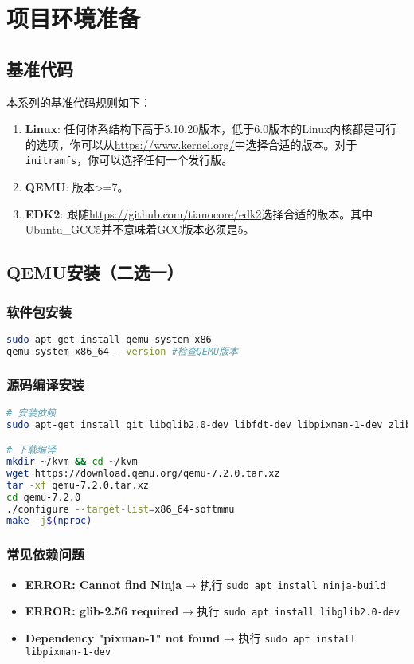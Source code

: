 \chapter{项目环境准备}

\section{基准代码}
本系列的基准代码规则如下：
\begin{enumerate}
    \item \textbf{Linux}: 任何体系结构下高于5.10.20版本，低于6.0版本的Linux内核都是可行的选项，你可以从\url{https://www.kernel.org/}中选择合适的版本。对于\texttt{initramfs}，你可以选择任何一个发行版。
    \item \textbf{QEMU}: 版本>=7。
    \item \textbf{EDK2}: 跟随\url{https://github.com/tianocore/edk2}选择合适的版本。其中Ubuntu\_GCC5并不意味着GCC版本必须是5。
\end{enumerate}
\section{QEMU安装（二选一）}
\subsection{软件包安装}
\begin{lstlisting}[language=bash]
sudo apt-get install qemu-system-x86
qemu-system-x86_64 --version #检查QEMU版本
\end{lstlisting}
\subsection{源码编译安装}
\begin{lstlisting}[language=bash]
# 安装依赖
sudo apt-get install git libglib2.0-dev libfdt-dev libpixman-1-dev zlib1g-dev ninja-build

# 下载编译
mkdir ~/kvm && cd ~/kvm
wget https://download.qemu.org/qemu-7.2.0.tar.xz
tar -xf qemu-7.2.0.tar.xz
cd qemu-7.2.0
./configure --target-list=x86_64-softmmu
make -j$(nproc)
\end{lstlisting}

\subsection{常见依赖问题}
\begin{itemize}
    \item \textbf{ERROR: Cannot find Ninja} → 执行 \texttt{sudo apt install ninja-build}
    \item \textbf{ERROR: glib-2.56 required} → 执行 \texttt{sudo apt install libglib2.0-dev}
    \item \textbf{Dependency "pixman-1" not found} → 执行 \texttt{sudo apt install libpixman-1-dev}
\end{itemize}

